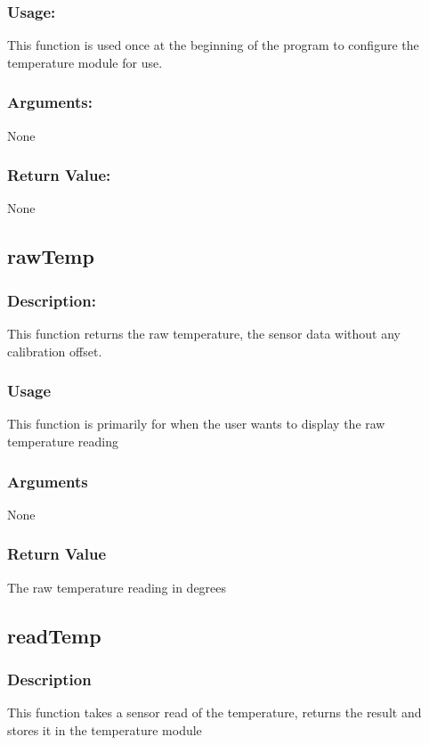 \documentclass[]{report}
\begin{document}
\subsubsection{Usage:}
This function is used once at the beginning of the program to configure the temperature module for use.

\subsubsection{Arguments:}
None

\subsubsection{Return Value:}
None

\subsection{rawTemp}
\subsubsection{Description:}
This function returns the raw temperature, the sensor data without any calibration offset.

\subsubsection{Usage}
This function is primarily for when the user wants to display the raw temperature reading

\subsubsection{Arguments}
None

\subsubsection{Return Value}
The raw temperature reading in degrees

\subsection{readTemp}
\subsubsection{Description}
This function takes a sensor read of the temperature, returns the result and stores it in the temperature module
\end{document}
